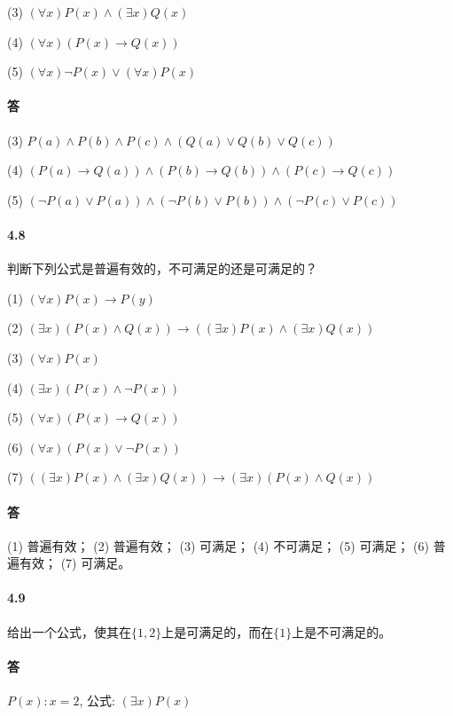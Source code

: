 \documentclass[hyperref, UTF8]{ctexart}
\begin{document}
(3) $( \forall x )P(x) \land ( \exists x ) Q(x) $

(4) $( \forall x ) (P(x) \rightarrow Q(x))$

(5) $( \forall x ) \lnot P(x) \lor ( \forall x ) P(x)$

\paragraph{答}
(3) $ P(a) \land P(b) \land P(c) \land (Q(a) \lor Q(b) \lor Q(c)) $

(4) $ (P(a) \rightarrow Q(a)) \land (P(b) \rightarrow Q(b)) \land (P(c) \rightarrow Q(c)) $

(5) $ ( \lnot P(a) \lor P(a)) \land ( \lnot P(b) \lor P(b)) \land ( \lnot P(c) \lor P(c)) $

\paragraph{4.8}\label{4.8}
判断下列公式是普遍有效的，不可满足的还是可满足的？

(1) $  ( \forall x)P(x) \rightarrow P(y) $ 

(2) $  ( \exists x)(P(x) \land Q(x)) \rightarrow ( ( \exists x)P(x) \land ( \exists x)Q(x)) $ 

(3) $  ( \forall x)P(x) $ 

(4) $ ( \exists x)(P(x) \land \lnot P(x)) $ 

(5) $  ( \forall x)(P(x) \rightarrow Q(x)) $ 

(6) $  ( \forall x)(P(x) \lor \lnot P(x)) $ 

(7) $ ( ( \exists x)P(x) \land ( \exists x)Q(x)) \rightarrow ( \exists x)(P(x) \land Q(x)) $

\paragraph{答} (1) 普遍有效； (2) 普遍有效； (3) 可满足； (4) 不可满足； (5) 可满足； (6) 普遍有效； (7) 可满足。

\paragraph{4.9}\label{4.9}
给出一个公式，使其在$  \{ 1, 2 \}  $上是可满足的，而在$  \{ 1 \} $上是不可满足的。

\paragraph{答} $P(x): x=2$, 公式: $(\exists x)P(x)$
\end{document}
